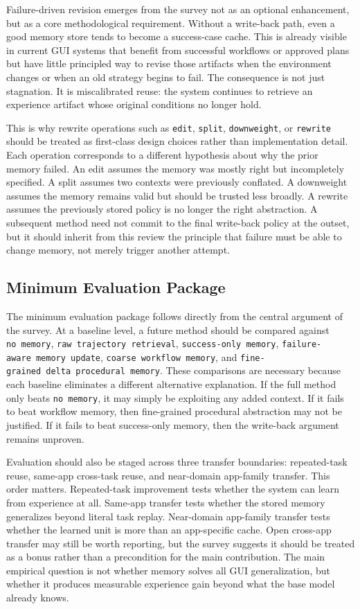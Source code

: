 \documentclass{article}
\begin{document}
Failure-driven revision emerges from the survey not as an optional
enhancement, but as a core methodological requirement. Without a
write-back path, even a good memory store tends to become a success-case
cache. This is already visible in current GUI systems that benefit from
successful workflows or approved plans but have little principled way to
revise those artifacts when the environment changes or when an old
strategy begins to fail. The consequence is not just stagnation. It is
miscalibrated reuse: the system continues to retrieve an experience
artifact whose original conditions no longer hold.

This is why rewrite operations such as \texttt{edit}, \texttt{split},
\texttt{downweight}, or \texttt{rewrite} should be treated as
first-class design choices rather than implementation detail. Each
operation corresponds to a different hypothesis about why the prior
memory failed. An edit assumes the memory was mostly right but
incompletely specified. A split assumes two contexts were previously
conflated. A downweight assumes the memory remains valid but should be
trusted less broadly. A rewrite assumes the previously stored policy is
no longer the right abstraction. A subsequent method need not commit to
the final write-back policy at the outset, but it should inherit from
this review the principle that failure must be able to change memory,
not merely trigger another attempt.

\subsection{Minimum Evaluation
Package}\label{74-minimum-evaluation-package}

The minimum evaluation package follows directly from the central
argument of the survey. At a baseline level, a future method should be
compared against \texttt{no\ memory},
\texttt{raw\ trajectory\ retrieval}, \texttt{success-only\ memory},
\texttt{failure-aware\ memory\ update},
\texttt{coarse\ workflow\ memory}, and
\texttt{fine-grained\ delta\ procedural\ memory}. These comparisons are
necessary because each baseline eliminates a different alternative
explanation. If the full method only beats \texttt{no\ memory}, it may
simply be exploiting any added context. If it fails to beat workflow
memory, then fine-grained procedural abstraction may not be justified.
If it fails to beat success-only memory, then the write-back argument
remains unproven.

Evaluation should also be staged across three transfer boundaries:
repeated-task reuse, same-app cross-task reuse, and near-domain
app-family transfer. This order matters. Repeated-task improvement tests
whether the system can learn from experience at all. Same-app transfer
tests whether the stored memory generalizes beyond literal task replay.
Near-domain app-family transfer tests whether the learned unit is more
than an app-specific cache. Open cross-app transfer may still be worth
reporting, but the survey suggests it should be treated as a bonus
rather than a precondition for the main contribution. The main empirical
question is not whether memory solves all GUI generalization, but
whether it produces measurable experience gain beyond what the base
model already knows.
\end{document}
